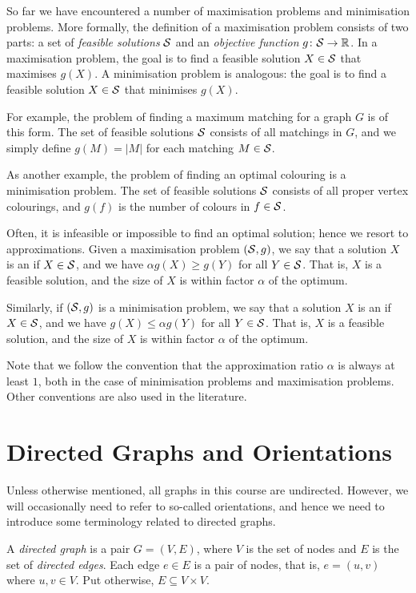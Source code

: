 So far we have encountered a number of maximisation problems and minimisation problems. More formally, the definition of a maximisation problem consists of two parts: a set of \emph{feasible solutions} $\mathcal{S}$ and an \emph{objective function} $g\colon \mathcal{S} \to \mathbb{R}$. In a maximisation problem, the goal is to find a feasible solution $X \in \mathcal{S}$ that maximises $g(X)$. A minimisation problem is analogous: the goal is to find a feasible solution $X \in \mathcal{S}$ that minimises $g(X)$.

For example, the problem of finding a maximum matching for a graph $G$ is of this form. The set of feasible solutions $\mathcal{S}$ consists of all matchings in $G$, and we simply define $g(M) = |M|$ for each matching $M \in \mathcal{S}$.

As another example, the problem of finding an optimal colouring is a minimisation problem. The set of feasible solutions $\mathcal{S}$ consists of all proper vertex colourings, and $g(f)$ is the number of colours in $f \in \mathcal{S}$.

Often, it is infeasible or impossible to find an optimal solution; hence we resort to approximations. Given a maximisation problem $(\mathcal{S},g)$, we say that a solution $X$ is an \emph{\Apx{\alpha}} if $X \in \mathcal{S}$, and we have $\alpha g(X) \ge g(Y)$ for all $Y \in \mathcal{S}$. That is, $X$ is a feasible solution, and the size of $X$ is within factor $\alpha$ of the optimum.

Similarly, if $(\mathcal{S},g)$ is a minimisation problem, we say that a solution $X$ is an \Apx{\alpha} if $X \in \mathcal{S}$, and we have $g(X) \le \alpha g(Y)$ for all $Y \in \mathcal{S}$. That is, $X$ is a feasible solution, and the size of $X$ is within factor $\alpha$ of the optimum.

Note that we follow the convention that the approximation ratio $\alpha$ is always at least $1$, both in the case of minimisation problems and maximisation problems. Other conventions are also used in the literature.


\section{Directed Graphs and Orientations}

Unless otherwise mentioned, all graphs in this course are undirected. However, we will occasionally need to refer to so-called orientations, and hence we need to introduce some terminology related to directed graphs.

A \emph{directed graph} is a pair $G = (V,E)$, where $V$ is the set of nodes and $E$ is the set of \emph{directed edges}. Each edge $e \in E$ is a pair of nodes, that is, $e = (u,v)$ where $u, v \in V$. Put otherwise, $E \subseteq V \times V$.

